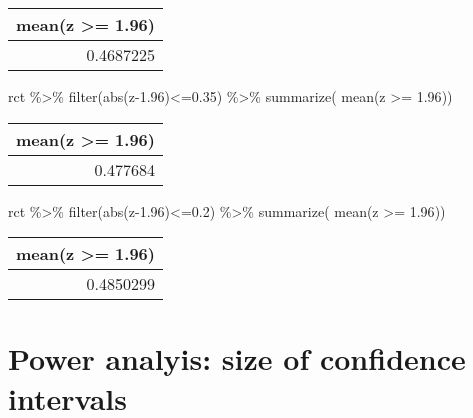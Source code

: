 \documentclass[
]{article}
\newenvironment{Shaded}{\begin{snugshade}}{\end{snugshade}}
\newcommand{\FloatTok}[1]{\textcolor[rgb]{0.00,0.00,0.81}{#1}}
\newcommand{\FunctionTok}[1]{\textcolor[rgb]{0.00,0.00,0.00}{#1}}
\newcommand{\NormalTok}[1]{#1}
\newcommand{\SpecialCharTok}[1]{\textcolor[rgb]{0.00,0.00,0.00}{#1}}
\begin{document}
\begin{longtable}[]{@{}r@{}}
\toprule
mean(z \textgreater= 1.96) \\
\midrule
\endhead
0.4687225 \\
\bottomrule
\end{longtable}

\begin{Shaded}
\begin{Highlighting}[]
\NormalTok{rct }\SpecialCharTok{\%\textgreater{}\%} \FunctionTok{filter}\NormalTok{(}\FunctionTok{abs}\NormalTok{(z}\FloatTok{{-}1.96}\NormalTok{)}\SpecialCharTok{\textless{}=}\FloatTok{0.35}\NormalTok{) }\SpecialCharTok{\%\textgreater{}\%} \FunctionTok{summarize}\NormalTok{( }\FunctionTok{mean}\NormalTok{(z }\SpecialCharTok{\textgreater{}=} \FloatTok{1.96}\NormalTok{))}
\end{Highlighting}
\end{Shaded}

\begin{longtable}[]{@{}r@{}}
\toprule
mean(z \textgreater= 1.96) \\
\midrule
\endhead
0.477684 \\
\bottomrule
\end{longtable}

\begin{Shaded}
\begin{Highlighting}[]
\NormalTok{rct }\SpecialCharTok{\%\textgreater{}\%} \FunctionTok{filter}\NormalTok{(}\FunctionTok{abs}\NormalTok{(z}\FloatTok{{-}1.96}\NormalTok{)}\SpecialCharTok{\textless{}=}\FloatTok{0.2}\NormalTok{) }\SpecialCharTok{\%\textgreater{}\%} \FunctionTok{summarize}\NormalTok{( }\FunctionTok{mean}\NormalTok{(z }\SpecialCharTok{\textgreater{}=} \FloatTok{1.96}\NormalTok{))}
\end{Highlighting}
\end{Shaded}

\begin{longtable}[]{@{}r@{}}
\toprule
mean(z \textgreater= 1.96) \\
\midrule
\endhead
0.4850299 \\
\bottomrule
\end{longtable}

\hypertarget{power-analyis-size-of-confidence-intervals}{%
\section{Power analyis: size of confidence
intervals}\label{power-analyis-size-of-confidence-intervals}}
\end{document}
